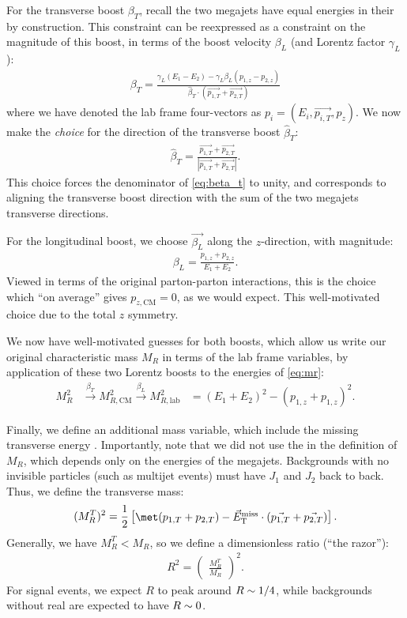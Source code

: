 For the transverse boost $\beta_T$, recall the two megajets have equal energies in their \rframe~ by construction.
This constraint can be reexpressed as a constraint on the magnitude of this boost, in terms of the boost velocity $\beta_L$ (and Lorentz factor $\gamma_L$):
\begin{align}\label{eq:beta_t}
\beta_T = \frac{ \gamma_L (E_1 - E_2) - \gamma_L \beta_L (p_{1,z} - p_{2,z})}
               { \hat{\beta}_T \cdot (\vec{p_{1,T}} + \vec{p_{2,T}} )}
\end{align}
where we have denoted the lab frame four-vectors as  $p_i = (E_i , \vec{p_{i,T}} , p_z)$.
We now make the \textit{choice} for the direction of the transverse boost $\hat{\beta}_T$:
\begin{align}
\hat{\beta}_T =  \frac{\vec{p_{1,T}} +  \vec{p_{2,T}}}{ | \vec{p_{1,T}} +  \vec{p_{2,T}}  | }.
\end{align}
This choice forces the denominator of \ref{eq:beta_t} to unity, and corresponds to aligning the transverse boost direction with the sum of the two megajets transverse directions.

For the longitudinal boost, we choose $\vec{\beta_L}$ along the $z$-direction, with magnitude:
\begin{align} \label{eq:beta_l}
\beta_L = \frac{p_{1,z} + p_{2,z}}{E_1+E_2}.
\end{align}
Viewed in terms of the original parton-parton interactions, this is the choice which ``on average'' gives $p_{z,\text{CM}} = 0$, as we would expect.
This well-motivated choice due to the total $z$ symmetry.

We now have well-motivated guesses for both boosts, which allow us write our original characteristic mass $M_R$ in terms of the lab frame variables, by application of these two Lorentz boosts to the energies of \ref{eq:mr}:
\begin{align}
M_R^2 &\xrightarrow[]{\beta_T } M_{R,\text{CM}}^{2} \xrightarrow[]{\beta_L } M_{R,\text{lab}}^{2}
      &=(E_1 + E_2)^2 - (p_{1,z} + p_{1,z})^2.
\end{align}

Finally, we define an additional mass variable, which include the missing transverse energy \met.
Importantly, note that we did not use the \met in the definition of $M_R$, which depends only on the energies of the megajets.
Backgrounds with no invisible particles (such as multijet events) must have $J_1$ and $J_2$ back to back.
Thus, we define the transverse mass:
\begin{align}
(M_R^T)^2 = \frac{1}{2} \begin{bmatrix} \met(p_{1,T}  + p_{2,T}) - \metvec \cdot (\vec{p_{1,T}}  + \vec{p_{2,T} })  \end{bmatrix}.
\end{align}
Generally, we have $M_R^T < M_R$, so we define a dimensionless ratio (``the razor''):
\begin{align}
R^2 = \begin{pmatrix} \frac{M_R^T}{M_R} \end{pmatrix}^2.
\end{align}
For signal events, we expect $R$ to peak around $R \sim 1/4$, while backgrounds without real \met are expected to have $R \sim 0$.

